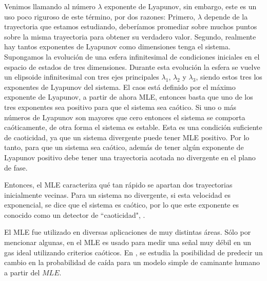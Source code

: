 Venimos llamando al número $\lambda$ exponente de Lyapunov, sin embargo, este es un uso poco riguroso de este término, por dos razones:
Primero, $\lambda$ depende de la trayectoria que estamos estudiando, deberíamos promediar sobre muchos puntos sobre la misma trayectoria para obtener su verdadero valor.
Segundo, realmente hay tantos exponentes de Lyapunov como dimensiones tenga el sistema.
Supongamos la evolución de una esfera infinitesimal de condiciones iniciales en el espacio de estados de tres dimensiones.
Durante esta evolución la esfera se vuelve un elipsoide infinitesimal con tres ejes principales $\lambda_1$, $\lambda_2$ y $\lambda_3$, siendo estos tres los exponentes de Lyapunov del sistema.
El caos está definido por el máximo exponente de Lyapunov, a partir de ahora MLE, entonces basta que uno de los tres exponentes sea positivo para que el sistema sea caótico.
Si uno o más números de Lyapunov son mayores que cero entonces el sistema se comporta caóticamente, de otra forma el sistema es estable.
Esta es una condición suficiente de caoticidad, ya que un sistema divergente puede tener MLE positivo.
Por lo tanto, para que un sistema sea caótico, además de tener algún exponente de Lyapunov positivo debe tener una trayectoria acotada no divergente en el plano de fase.

Entonces, el MLE caracteriza qué tan rápido se apartan dos trayectorias inicialmente vecinas.
Para un sistema no divergente, si esta velocidad es exponencial, se dice que el sistema es caótico, por lo que este exponente es conocido como un detector de  ``caoticidad", \cite{Strogatz2018,Kantz1994,Sprott2003}.

El MLE fue utilizado en diversas aplicaciones de muy distintas áreas.
Sólo por mencionar algunas, en \cite{Ma2013} el MLE es usado para medir una señal muy débil en un gas ideal utilizando criterios caóticos.
En \cite{Bruijna2011}, se estudia la posibilidad de predecir un cambio en la probabilidad de caída para un modelo simple de caminante humano a partir del $MLE$.

